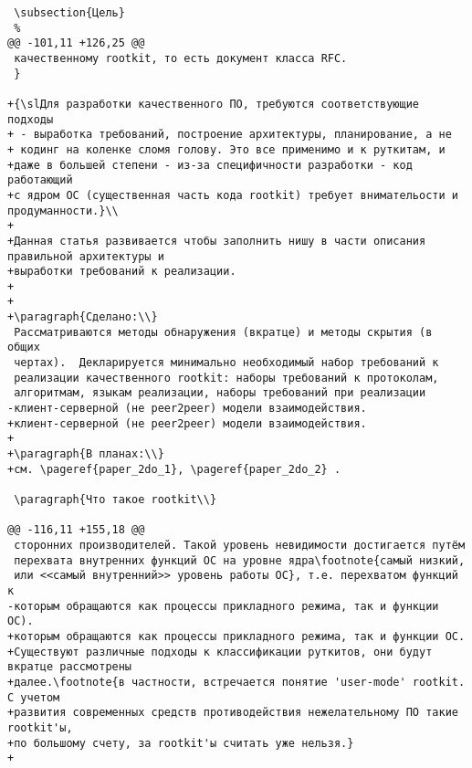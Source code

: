 \begin{verbatim}
 \subsection{Цель}
 %
@@ -101,11 +126,25 @@
 качественному rootkit, то есть документ класса RFC.
 }

+{\slДля разработки качественного ПО, требуются соответствующие подходы
+ - выработка требований, построение архитектуры, планирование, а не
+ кодинг на коленке сломя голову. Это все применимо и к руткитам, и
+даже в большей степени - из-за специфичности разработки - код работающий
+с ядром ОС (существенная часть кода rootkit) требует внимательости и продуманности.}\\
+
+Данная статья развивается чтобы заполнить нишу в части описания правильной архитектуры и
+выработки требований к реализации.
+
+
+\paragraph{Сделано:\\}
 Рассматриваются методы обнаружения (вкратце) и методы скрытия (в общих
 чертах).  Декларируется минимально необходимый набор требований к
 реализации качественного rootkit: наборы требований к протоколам,
 алгоритмам, языкам реализации, наборы требований при реализации
-клиент-серверной (не peer2peer) модели взаимодействия.
+клиент-серверной (не peer2peer) модели взаимодействия.
+
+\paragraph{В планах:\\}
+см. \pageref{paper_2do_1}, \pageref{paper_2do_2} .

 \paragraph{Что такое rootkit\\}

@@ -116,11 +155,18 @@
 сторонних производителей. Такой уровень невидимости достигается путём
 перехвата внутренних функций ОС на уровне ядра\footnote{самый низкий,
 или <<самый внутренний>> уровень работы ОС}, т.е. перехватом функций к
-которым обращаются как процессы прикладного режима, так и функции ОС).
+которым обращаются как процессы прикладного режима, так и функции ОС.
+Существуют различные подходы к классификации руткитов, они будут вкратце рассмотрены
+далее.\footnote{в частности, встречается понятие 'user-mode' rootkit. С учетом
+развития современных средств противодействия нежелательному ПО такие rootkit'ы,
+по большому счету, за rootkit'ы считать уже нельзя.}
+


\end{verbatim}
